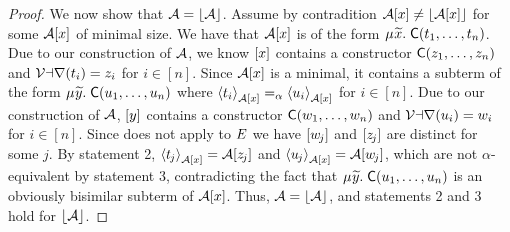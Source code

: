 \begin{report}
\begin{proof}
We now show that $\Val = \nf{\Val}$.
Assume by contradition $\Val \ec{x} \neq \nf{\Val \ec{x}}$ for some $\Val \ec{x}$ of minimal size.
We have that $\Val \ec{x}$ is of the form $\MU {\Varec{x}}.\; \const{C}( t_1, \ldots, t_n )$.
Due to our construction of $\Val$, 
we know $\ec{x}$ contains a constructor $\const{C}( z_1, \ldots, z_n )$ and $\muvar( t_i ) = z_i$ for $i \in [n]$.
Since $\Val \ec{x}$ is a minimal, it
contains a subterm of the form $\MU {\Varec{y}}.\; \const{C}( u_1, \ldots, u_n )$
where $\interp{\Val \ec{x}}{ t_i } \aequiv \interp{\Val \ec{x} }{ u_i }$ for $i \in [n]$.
Due to our construction of $\Val$, $\ec{y}$ contains a constructor $\const{C}( w_1, \ldots, w_n )$ and $\muvar( u_i ) = w_i$ for $i \in [n]$.
Since  does not apply to $\Ec$
we have $\ec{w_{\negvthinspace j}}$ and $\ec{z_{\negvthinspace j}}$ are distinct for some $j$.
By statement 2, $\interp{\Val \ec{x}}{ t_{\negvthinspace j} } = \Val \ec{z_{\negvthinspace j}}$
and $\interp{\Val \ec{x}}{ u_{\negvthinspace j} } = \Val \ec{w_{\negvthinspace j}}$,
which are not $\alpha$-equivalent by statement 3, contradicting the fact that $\MU {\Varec{y}}.\; \const{C}( u_1, \ldots, u_n )$ is an obviously bisimilar subterm of $\Val \ec{x}$.
Thus, $\Val = \nf{\Val}$, and statements 2 and 3 hold for $\nf{\Val}$.


\end{proof}
\end{report}
